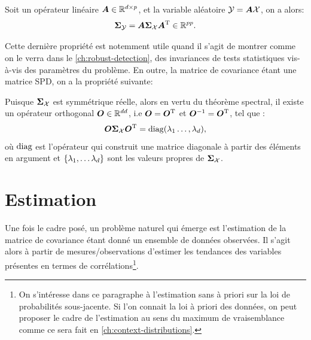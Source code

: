 \begin{property}
  \label{prop:context-definition-lineartraonsformation}
  Soit un opérateur linéaire $\boldsymbol{A}\in\mathbb{R}^{d\times p}$, et la variable aléatoire $\mathcal{Y}=\boldsymbol{A}\mathcal{X}$, on a alors:
  \begin{equation}
    \boldsymbol{\Sigma}_{\mathcal{Y}} = \boldsymbol{A}\boldsymbol{\Sigma}_{\mathcal{X}}\boldsymbol{A}^{\mathrm{T}} \in \mathbb{R}^{pp}.
    \label{eq:context-definition-lineartraonsformation}
  \end{equation}

\end{property}

Cette dernière propriété est notemment utile quand il s'agit de montrer comme on le verra dans le \cref{ch:robust-detection}, des invariances de tests statistiques vis-à-vis des paramètres du problème. En outre, la matrice de covariance étant une matrice SPD, on a la propriété suivante:

\begin{property}[{Diagonalisation}]
  \label{prop:context-definition-diagonalisation}
  Puisque $\boldsymbol{\Sigma}_{\mathcal{X}}$ est symmétrique réelle, alors en vertu du théorème spectral, il existe un opérateur orthogonal $\boldsymbol{O}\in\mathbb{R}^{dd}$, i.e $\boldsymbol{O}=\boldsymbol{O}^{\mathrm{T}}$ et $\boldsymbol{O}^{-1}=\boldsymbol{O}^{\mathrm{T}}$, tel que :
  \begin{equation}
    \boldsymbol{O}\boldsymbol{\Sigma}_{\mathcal{X}}\boldsymbol{O}^{\mathrm{T}} = \operatorname{\operatorname{diag}}(\lambda_1\dots,\lambda_d),
    \label{eq:context-definition-diagonalisation}
  \end{equation}
  où $\operatorname{\operatorname{diag}}$ est l'opérateur qui construit une matrice diagonale à partir des éléments en argument et $\{\lambda_1,\dots\lambda_d\}$ sont les valeurs propres de $\boldsymbol{\Sigma}_{\mathcal{X}}$.

\end{property}

\section{Estimation}
\label{sec:context-covariance-estimation}

Une fois le cadre posé, un problème naturel qui émerge est l'estimation de la matrice de covariance étant donné un ensemble de données observées. Il s'agit alors à partir de mesures/observations d'estimer les tendances des variables présentes en termes de corrélations\footnote{On s'intéresse dans ce paragraphe à l'estimation sans à priori sur la loi de probabilités sous-jacente. Si l'on connait la loi à priori des données, on peut proposer le cadre de l'estimation au sens du maximum de vraisemblance comme ce sera fait en \cref{ch:context-distributions}.}.

